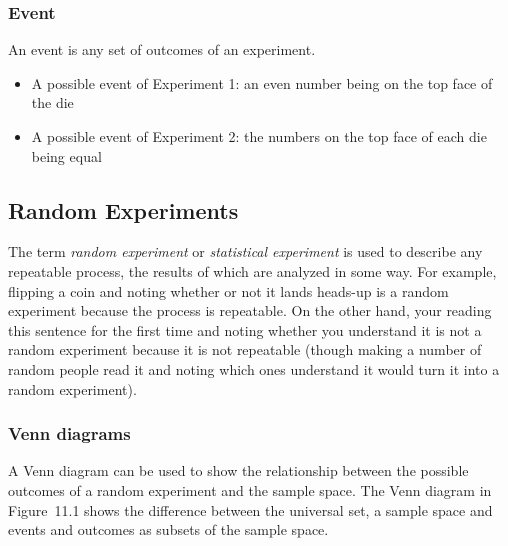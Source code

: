         
        \label{m39377*uid9}
            \subsubsection{ Event}
            \nopagebreak
            
          
          
          
          \label{m39377*eip-898}An event is any set of outcomes of an
experiment.\par \label{m39377*eip-608}\begin{itemize}[noitemsep]
            \item A possible event of Experiment 1: an
even number being on the top face of the die\item A possible event of Experiment 2: the numbers on the top face of each die
being equal\end{itemize}
        


   
    \label{m39377*cid3}
            \subsection{ Random Experiments}
            \nopagebreak
            
      
      \label{m39377*id110059}The term \textsl{random
experiment} or \textsl{statistical
experiment} is used to describe any repeatable process, the results of
which are analyzed in some way. For example, flipping a coin and noting whether
or not it lands heads-up is a random experiment because the process is
repeatable. On the other hand, your reading this sentence for the first time and
noting whether you understand it is not a random experiment because it is not
repeatable (though making a number of random people read it and noting which
ones understand it would turn it into a random experiment).\par 
      
     
\label{m39377*id7342}
            \subsubsection{ Venn diagrams}
            \nopagebreak
            \label{m39377*id110213}A Venn diagram can be used to show
the relationship between the possible outcomes of a random experiment and the
sample space. The Venn diagram in Figure~11.1 shows the difference
between the universal set, a sample space and events and outcomes as subsets of
the sample space.\par 
          
